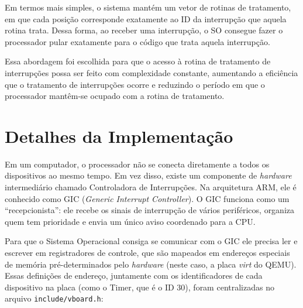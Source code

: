 Em termos mais simples, o sistema mantém um vetor de rotinas de tratamento, em que cada posição corresponde exatamente ao ID da interrupção que aquela rotina trata. Dessa forma, ao receber uma interrupção, o SO consegue fazer o processador pular exatamente para o código que trata aquela interrupção.

Essa abordagem foi escolhida para que o acesso à rotina de tratamento de interrupções possa ser feito com complexidade constante, aumentando a eficiência que o tratamento de interrupções ocorre e reduzindo o período em que o processador mantêm-se ocupado com a rotina de tratamento.
\section{Detalhes da Implementação}
%
%
Em um computador, o processador não se conecta diretamente a todos os dispositivos ao mesmo tempo. Em vez disso, existe um componente de \emph{hardware} intermediário chamado Controladora de Interrupções. Na arquitetura ARM, ele é conhecido como GIC (\emph{Generic Interrupt Controller}). O GIC funciona como um ``recepcionista'': ele recebe os sinais de interrupção de vários periféricos, organiza quem tem prioridade e envia um único aviso coordenado para a CPU.

Para que o Sistema Operacional consiga se comunicar com o GIC ele precisa ler e escrever em registradores de controle, que são mapeados em endereços especiais de memória pré-determinados pelo \emph{hardware} (neste caso, a placa \emph{virt} do QEMU). Essas definições de endereço, juntamente com os identificadores de cada dispositivo na placa (como o Timer, que é o ID 30), foram centralizadas no arquivo \texttt{include/vboard.h}:

